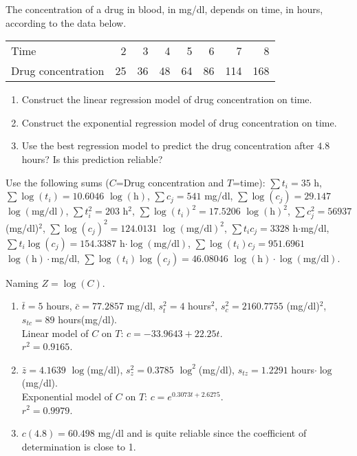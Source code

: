 {The concentration of a drug in blood, in mg/dl, depends on time, in hours, according to the data below.
\begin{center}
\begin{tabular}{lrrrrrrr}
\toprule
Time & 2 & 3 & 4 & 5 & 6 & 7 & 8\\
Drug concentration & 25 & 36 & 48 & 64 & 86 & 114 & 168\\
\bottomrule
\end{tabular}
\end{center}
\begin{enumerate}
\item Construct the linear regression model of drug concentration on time.
\item Construct the exponential regression model of drug concentration on time.
\item Use the best regression model to predict the drug concentration after $4.8$ hours? Is this prediction reliable?
\end{enumerate}

Use the following sums ($C$=Drug concentration and $T$=time): $\sum t_i=35$ h, $\sum \log(t_i)=10.6046$
$\log(\mbox{h})$, $\sum c_j=541$ mg/dl, $\sum \log(c_j)= 29.147$ $\log(\mbox{mg/dl})$, $\sum t_i^2=203$ h$^2$,
$\sum \log(t_i)^2=17.5206$ $\log(\mbox{h})^2$, $\sum c_j^2=56937$ (mg/dl)$^2$, $\sum \log(c_j)^2=124.0131$
$\log(\mbox{mg/dl})^2$, $\sum t_ic_j=3328$ h$\cdot$mg/dl, $\sum t_i\log(c_j)=154.3387$
h$\cdot\log(\mbox{mg/dl})$, $\sum \log(t_i)c_j=951.6961$ $\log(\mbox{h})\cdot$mg/dl, $\sum
\log(t_i)\log(c_j)=46.08046$ $\log(\mbox{h})\cdot\log(\mbox{mg/dl})$.
}
{Naming $Z=\log(C)$.
\begin{enumerate}
\item $\bar t=5$ hours, $\bar c=77.2857$ mg/dl, $s_t^2=4$ hours$^2$,  $s_c^2=2160.7755$ (mg/dl)$^2$, $s_{tc}=89$ hours(mg/dl).\\
Linear model of $C$ on $T$: $c=-33.9643+22.25t$.\\
$r^2=0.9165$.
\item  $\bar z=4.1639$ $\log$(mg/dl), $s_z^2=0.3785$ $\log^2$(mg/dl),
$s_{tz}=1.2291$ hours$\cdot\log$(mg/dl).\\
Exponential model of $C$ on $T$: $c=e^{0.3073t+2.6275}$.\\
$r^2=0.9979$.
\item $c(4.8)= 60.498$ mg/dl and is quite reliable since the coefficient of determination is close to 1.
\end{enumerate}
}

